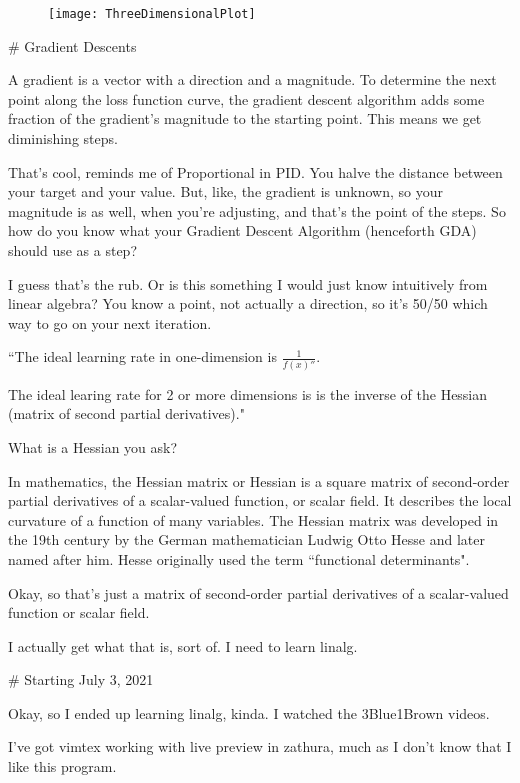 \begin{markdown}
\begin{figure}[h]
    \texttt{[image: ThreeDimensionalPlot]}
    \centering
\end{figure}

# Gradient Descents

A gradient is a vector with a direction and a magnitude. To determine the next
point along the loss function curve, the gradient descent algorithm adds some
fraction of the gradient's magnitude to the starting point. This means we get
diminishing steps.

That's cool, reminds me of Proportional in PID. You halve the distance between
your target and your value. But, like, the gradient is unknown, so your
magnitude is as well, when you're adjusting, and that's the point of the steps.
So how do you know what your Gradient Descent Algorithm (henceforth GDA) should
use as a step?

I guess that's the rub. Or is this something I would just know intuitively from
linear algebra? You know a point, not actually a direction, so it's 50/50 which
way to go on your next iteration.

``The ideal learning rate in one-dimension is $\frac{1}{f(x)''}$.

The ideal learing rate for 2 or more dimensions is is the inverse of the Hessian
(matrix of second partial derivatives)."

What is a Hessian you ask?

\begin{definition}
    In mathematics, the Hessian matrix or Hessian is a square matrix of
    second-order partial derivatives of a scalar-valued function, or scalar
    field. It describes the local curvature of a function of many variables. The
    Hessian matrix was developed in the 19th century by the German mathematician
    Ludwig Otto Hesse and later named after him. Hesse originally used the term
    ``functional determinants".
\end{definition}

Okay, so that's just a matrix of second-order partial derivatives of a
scalar-valued function or scalar field.

I actually get what that is, sort of. I need to learn linalg.

# Starting July 3, 2021

Okay, so I ended up learning linalg, kinda. I watched the 3Blue1Brown videos.

I've got vimtex working with live preview in zathura, much as I don't know that
I like this program.


\end{markdown}


